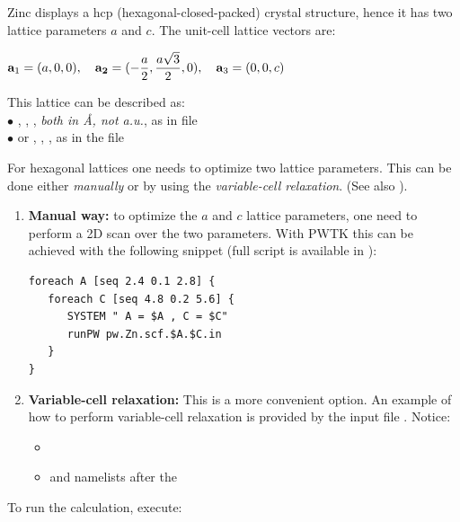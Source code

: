 \documentclass[landscape]{foils}
\begin{document}
%
Zinc displays a hcp (hexagonal-closed-packed) crystal structure, hence
it has two lattice parameters $a$ and $c$. The unit-cell lattice
vectors are:\\
%
\centerline{$\displaystyle
  {\bf a}_1=(a,0,0), \quad {\bf a_2}=(-{a\over 2},{a\sqrt{3}\over 2},0),
  \quad {\bf a}_3=(0,0,c)$}
%
This lattice can be described as:\\
$\bullet$ , , , {\em both in \AA,
  not a.u.}, as in file \\
$\bullet$ or , , ,
as in the file 

For hexagonal lattices one needs to optimize two lattice
parameters. This can be done either {\em manually} or by using the
{\em variable-cell relaxation}. (See also ).
\vspace{-1em}
\begin{enumerate}
\item {\bf Manual way:} to optimize the $a$ and $c$ lattice
  parameters, one need to perform a 2D scan over the two
  parameters. With PWTK this can be achieved with the following
  snippet (full script is available in
  ):
  \vspace{-0.5em}
  {\codecolor
\begin{verbatim}
foreach A [seq 2.4 0.1 2.8] {
   foreach C [seq 4.8 0.2 5.6] {
      SYSTEM " A = $A , C = $C"        
      runPW pw.Zn.scf.$A.$C.in
   }
}
\end{verbatim}
  }
\item {\bf Variable-cell relaxation:} This is a more convenient
  option. An example of how to perform variable-cell relaxation is
  provided by the input file . Notice:
  \begin{itemize}
  \item {}
  \item {} and  namelists after the 
  \end{itemize}
\end{enumerate}
To run the calculation, execute:\\[0.5em]
\end{document}
